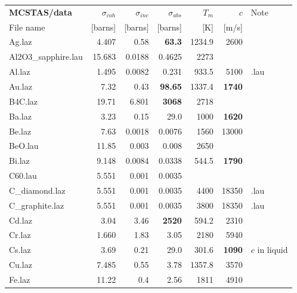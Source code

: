 \begin{table}
  \begin{center}
    {\let\my=\\
    \begin{small}
    \begin{tabular}{|l|rrr|rr|p{}|}

      \hline
      \textbf{MCSTAS/data} & $\sigma_{coh}$&$\sigma_{inc}$&$\sigma_{abs}$&$T_m$       & $c$    & Note \\
          File name     & [barns]     & [barns]    & [barns]    & [K]        & [m/s] & \\
      \hline
Ag.laz             & 4.407     & 0.58     &\textbf{63.3}      &1234.9    &2600&\\
Al2O3\_sapphire.lau & 15.683    & 0.0188   &0.4625    &2273      &   &\\
Al.laz             & 1.495     & 0.0082   &0.231     &933.5     &5100& .lau\\
Au.laz             & 7.32      & 0.43     &\textbf{98.65}     &1337.4    &\textbf{1740}&\\
B4C.laz            & 19.71     & 6.801    &\textbf{3068}      &2718      &     &\\
Ba.laz             & 3.23      & 0.15     &29.0      &1000      &\textbf{1620}&\\
Be.laz             & 7.63      & 0.0018   &0.0076    &1560      &13000&\\
BeO.lau            & 11.85     & 0.003    &0.008     &2650      &   & \\
Bi.laz             & 9.148     & 0.0084   &0.0338    &544.5     &\textbf{1790}&\\
C60.lau            & 5.551     & 0.001    &0.0035    &          &   &\\
C\_diamond.laz      & 5.551     & 0.001    &0.0035    &4400      &18350 & .lau\\
C\_graphite.laz     & 5.551     & 0.001    &0.0035    &3800      &18350 & .lau\\
Cd.laz             & 3.04      & 3.46     &\textbf{2520}      &594.2     &2310&\\
Cr.laz             & 1.660     & 1.83     &3.05      &2180      &5940&\\
Cs.laz             & 3.69      & 0.21     &29.0      &301.6     &\textbf{1090}  & $c$ in liquid\\
Cu.laz             & 7.485     & 0.55     &3.78      &1357.8    &3570&\\
Fe.laz             & 11.22     & 0.4      &2.56      &1811      &4910&\\

\end{tabular}
\end{small}}
\end{center}
\end{table}
